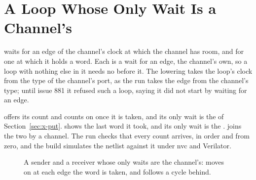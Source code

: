 \section{A Loop Whose Only Wait Is a Channel's}
\label{sec:x-chanwait}

 waits for an edge of the channel's clock at
which the channel has room, and  for one at which
it holds a word. Each is a wait for an edge, the channel's own, so a
loop with nothing else in it needs no  before it.
The lowering takes the loop's clock from the type of the channel's
port, as the run takes the edge from the channel's type; until issue
881 it refused such a loop, saying it did not start by waiting for an
edge.

 offers its count and counts on once it is taken, and its
only wait is the  of Section~\ref{sec:x-put}. 
shows the last word it took, and its only wait is the .
 joins the two by a channel. The run checks that every
count arrives, in order and from zero, and the build simulates the
netlist against it under nvc and Verilator.

\begin{figure}[htbp]
\centering

\caption{A sender and a receiver whose only waits are the channel's:
 moves on at each edge the word is taken, and 
follows a cycle behind.}
\label{fig:x-chanwait}
\end{figure}




